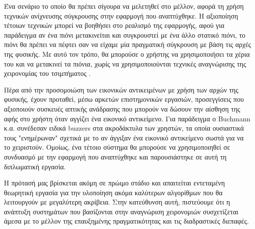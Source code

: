 Ένα σενάριο το οποίο θα πρέπει σίγουρα να μελετηθεί στο μέλλον, αφορά τη χρήση τεχνικών ανίχνευσης σύγκρουσης στην εφαρμογή που αναπτύχθηκε. Η αξιοποίηση τέτοιων τεχνικών μπορεί να βοηθήσει στο ρεαλισμό της εφαρμογής, αφού για παράδειγμα αν ένα πιόνι μετακινείται και συγκρουστεί με ένα άλλο στατικό πιόνι, το πιόνι θα πρέπει να πέφτει σαν να είχαμε μία πραγματική σύγκρουση με βάση τις αρχές της φυσικής. Με αυτό τον τρόπο, θα μπορούσε ο χρήστης να χρησιμοποιήσει τα χέρια του και να μετακινεί τα πιόνια, χωρίς να χρησιμοποιούνται τεχνικές αναγνώρισης της χειρονομίας του τσιμπήματος \cite{Song2008}.


Πέρα από την προσομοιώση των εικονικών αντικειμένων με χρήση των αρχών της φυσικής, έχουν προταθεί, μέσω αρκετών επιστημονικών εργασιών, προσεγγίσεις που αξιοποιούν συσκευές απτικής ανάδρασης που μπορούν να δώσουν την αίσθηση της αφής στο χρήστη όταν αγγίζει ένα εικονικό αντικείμενο. Για παράδειγμα ο Buchmann κ.α. \cite{Buchmann2004} συνέδεσαν ειδικά buzzers στα ακροδάκτυλα των χρηστών, τα οποία ουσιαστικά τους "ενημέρωναν" σχετικά με το αν άγγιξαν ένα εικονικό αντικείμενο σωστά για να το χειριστούν. Ομοίως, ένα τέτοιο σύστημα θα μπορούσε να χρησιμοποιηθεί σε συνδυασμό με την εφαρμογή που αναπτύχθηκε και παρουσιάστηκε σε αυτή τη διπλωματική εργασία.


Η πρότασή μας βρίσκεται ακόμη σε πρώιμο στάδιο και απαιτείται εντεταμένη θεωρητική εργασία για την υλοποίηση ακόμα καλύτερων αλγορίθμων που θα λειτουργούν με μεγαλύτερη ακρίβεια. Στην κατεύθυνση αυτή, πιστεύουμε ότι η ανάπτυξη συστημάτων που βασίζονται στην αναγνώριση χειρονομιών συσχετίζεται άμεσα με το μέλλον της επαυξημένης πραγματικότητας και τις διαδραστικές διεπαφές.